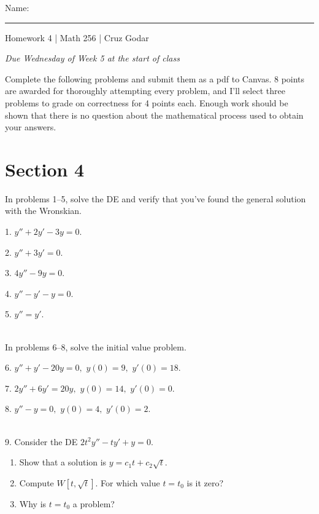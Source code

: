 \documentclass{article}
\begin{document}
\Large Name: \rule{2in}{0.15mm} \hfill Homework 4 | Math 256 | Cruz Godar \vspace{4pt} \normalsize

\textit{Due Wednesday of Week 5 at the start of class}

Complete the following problems and submit them as a pdf to Canvas. 8 points are awarded for thoroughly attempting every problem, and I'll select three problems to grade on correctness for 4 points each. Enough work should be shown that there is no question about the mathematical process used to obtain your answers.

\section{Section 4}

In problems 1--5, solve the DE and verify that you've found the general solution with the Wronskian.

1. $\displaystyle y'' + 2y' - 3y = 0.$

2. $\displaystyle y'' + 3y' = 0.$

3. $\displaystyle 4y'' - 9y = 0.$

4. $\displaystyle y'' - y' - y = 0.$

5. $\displaystyle y'' = y'.$

~\\

In problems 6--8, solve the initial value problem.

6. $\displaystyle y'' + y' - 20y = 0,$ $\displaystyle y(0) = 9,$ $\displaystyle y'(0) = 18.$

7. $\displaystyle 2y'' + 6y' = 20y,$ $\displaystyle y(0) = 14,$ $\displaystyle y'(0) = 0.$

8. $\displaystyle y'' - y = 0,$ $\displaystyle y(0) = 4,$ $\displaystyle y'(0) = 2.$

~\\

9. Consider the DE $\displaystyle 2t^2y'' - ty' + y = 0.$

\begin{enumerate}

	\item Show that a solution is $\displaystyle y = c_1t + c_2\sqrt{t}.$

	\item Compute $\displaystyle W\left[t, \sqrt{t}\right].$ For which value $t = t_0$ is it zero?

	\item Why is $t = t_0$ a problem?

\end{enumerate}
\end{document}
